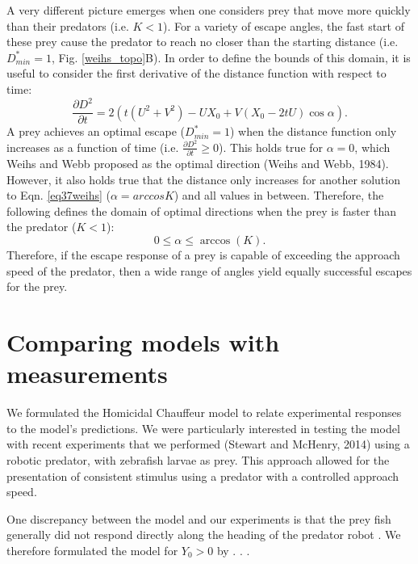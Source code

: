 \documentclass[12pt]{article}
\def\d{\partial}
\begin{document}
A very different picture emerges when one considers prey that move more quickly than their predators (i.e. $K<1$). For a variety of escape angles, the fast start of these prey cause the predator to reach no closer than the starting distance (i.e. $D_{min}^*=1$, Fig. \ref{weihs_topo}B). In order to define the bounds of this domain, it is useful to consider the first derivative of the distance function with respect to time:
%
\begin{equation}
\frac{\d D^2}{\d t}= 2(t(U^2+V^2) - UX_0 + V(X_0-2tU)\cos\alpha).
\label{distderivative}
\end{equation}  
%
A prey achieves an optimal escape ($D_{min}^*=1$) when the distance function only increases as a function of time (i.e. $\frac{\d D^2}{\d t}\geq0$). This holds true for $\alpha=0$, which Weihs and Webb proposed as the optimal direction (Weihs and Webb, 1984). However, it also holds true that the distance only increases for another solution to Eqn. \ref{eq37weihs} ($\alpha=arccos K$) and all values in between. Therefore, the following defines the domain of optimal directions when the prey is faster than the predator ($K<1$):
%
\begin{equation}
0 \leq \alpha \leq \arccos(K).
\label{anglerange}
\end{equation}
%
Therefore, if the escape response of a prey is capable of exceeding the approach speed of the predator, then a wide range of angles yield equally successful escapes for the prey.


\section{Comparing models with measurements}

We formulated the Homicidal Chauffeur model to relate experimental responses to the model's predictions. We were particularly interested in testing the model with recent experiments that we performed (Stewart and McHenry, 2014) using a robotic predator, with zebrafish larvae as prey. This approach allowed for the presentation of consistent stimulus using a predator with a controlled approach speed. 

One discrepancy between the model and our experiments is that the prey fish generally did not respond directly along the heading of the predator robot \cite{Stewart:2014cm}. We therefore formulated the model for $Y_0>0$ by  . . .

\cite{Domenici:2011tv}
\cite{Weihs:1984tb}
\cite{Stewart:2014cm}
\end{document}
